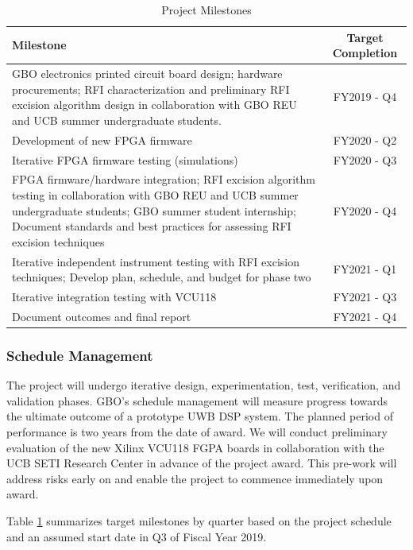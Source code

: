 \documentclass[10pt]{myNSF}
\begin{document}
\begin{table}[h]
  \centering
  \caption{Project Milestones \label{table:milestones}}
  \begin{tabular}{|p{5in}|c|}
    \hline
    Milestone & Target Completion \\
    \hline
    GBO electronics printed circuit board design; hardware procurements; RFI characterization and preliminary RFI excision algorithm design in collaboration with GBO REU and UCB summer undergraduate students. & FY2019 - Q4 \\
    \hline
    Development of new FPGA firmware & FY2020 - Q2 \\
    \hline
    Iterative FPGA firmware testing (simulations) & FY2020 - Q3 \\
    \hline
    FPGA firmware/hardware integration; RFI excision algorithm testing in collaboration with GBO REU and UCB summer undergraduate students; GBO summer student internship; Document standards and best practices for assessing RFI excision techniques & FY2020 - Q4 \\
    \hline
    Iterative independent instrument testing with RFI excision techniques; Develop plan, schedule, and budget for phase two & FY2021 - Q1 \\
    \hline
    Iterative integration testing with VCU118 & FY2021 - Q3 \\
    \hline
    Document outcomes and final report & FY2021 - Q4 \\
    \hline
  \end{tabular}
\end{table}

\subsubsection{Schedule Management}
\label{sec:schedule}

The project will undergo iterative design, experimentation, test,
verification, and validation phases. GBO's schedule management will
measure progress towards the ultimate outcome of a prototype UWB DSP
system. The planned period of performance is two years from the date
of award.  We will conduct preliminary evaluation of the new Xilinx
VCU118 FGPA boards in collaboration with the UCB SETI Research Center
in advance of the project award. This pre-work will address risks
early on and enable the project to commence immediately upon award.

Table \ref{table:milestones} summarizes target milestones by quarter
based on the project schedule and an assumed start date in Q3 of
Fiscal Year 2019.
\end{document}
